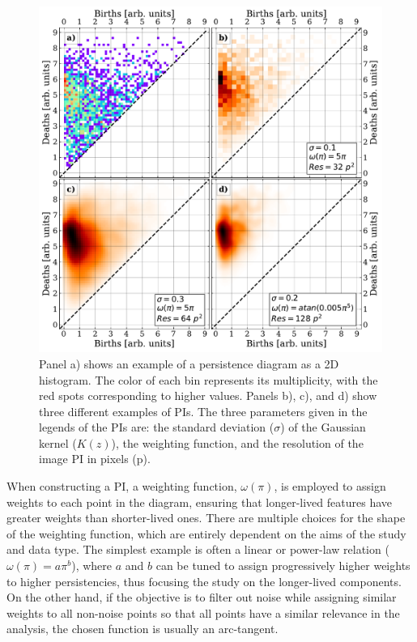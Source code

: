 \documentclass[12pt]{mythesis}
\begin{document}
\begin{figure}
    \centering
    \includegraphics[width=12cm]{figures/PersistentHomology/PI_Example.pdf}
    \caption{Panel a) shows an example of a persistence diagram as a 2D histogram. The color of each bin represents its multiplicity, with the red spots corresponding to higher values. Panels b), c), and d) show three different examples of PIs. The three parameters given in the legends of the PIs are: the standard deviation ($\sigma$) of the Gaussian kernel ($K (z)$), the weighting function, and the resolution of the image PI in pixels (p).}
   \label{fig_ph: PI Example}
\end{figure}

When constructing a PI, a weighting function, $\omega (\pi)$, is employed to assign weights to each point in the diagram, ensuring that longer-lived features have greater weights than shorter-lived ones. There are multiple choices for the shape of the weighting function, which are entirely dependent on the aims of the study and data type. The simplest example is often a linear or power-law relation ($\omega (\pi) = a \pi ^b$), where $a$ and $b$ can be tuned to assign progressively higher weights to higher persistencies, thus focusing the study on the longer-lived components. On the other hand, if the objective is to filter out noise while assigning similar weights to all non-noise points so that all points have a similar relevance in the analysis, the chosen function is usually an arc-tangent.
\end{document}
